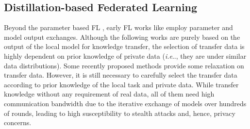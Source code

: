 \documentclass[letterpaper]{article} %
\makeatletter
\DeclareRobustCommand\onedot{\futurelet\@let@token\@onedot}
\def\@onedot{\ifx\@let@token.\else.\null\fi\xspace}
\def\ie{\emph{i.e}\onedot} \def\Ie{\emph{I.e}\onedot}
\makeatother
\begin{document}
\subsection{Distillation-based Federated Learning}


Beyond the parameter based FL \cite{mcmahan2017communication, hsu2019measuring,li2018federated}, early FL works like \cite{jeong2018communication} employ parameter and model output exchanges. Although the following works \cite{li2019fedmd, chang2019cronus, li2021practical} are purely based on the output of the local model for knowledge transfer, the selection of transfer data is highly dependent on prior knowledge of private data (\ie, they are under similar data distributions). Some recently proposed methods \cite{lin2020ensemble, gong2022preserving} provide some relaxation on transfer data. However, it is still necessary to carefully select the transfer data according to prior knowledge of the local task and private data.
While \cite{zhu2021data, zhang2022fedzkt, zhang2022fine} transfer knowledge without any requirement of real data, all of them need high communication bandwidth due to the iterative exchange of models over hundreds of rounds, leading to high susceptibility to stealth attacks and, hence, privacy concerns. 
\end{document}
